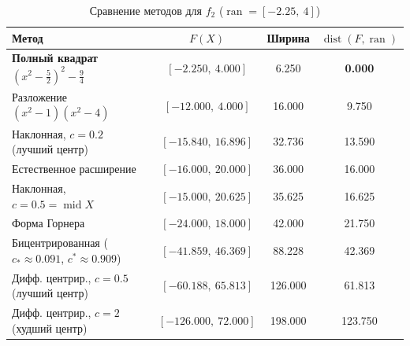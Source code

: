 \documentclass[12pt,a4paper]{article}
\newcommand{\ran}{\operatorname{ran}}
\newcommand{\Mid}{\operatorname{mid}}
\newcommand{\dist}{\operatorname{dist}}
\begin{document}
\begin{table}[H]
\centering
\begin{tabular}{|l|c|c|c|}
\hline
Метод & $F(X)$ & Ширина & $\dist(F,\ran)$ \\
\hline
\textbf{Полный квадрат} $(x^2-\frac52)^2-\frac94$ & $[-2.250,\ 4.000]$ & 6.250 & \textbf{0.000} \\
Разложение $(x^2-1)(x^2-4)$ & $[-12.000,\ 4.000]$ & 16.000 & 9.750 \\
Наклонная, $c=0.2$ (лучший центр) & $[-15.840,\ 16.896]$ & 32.736 & 13.590 \\
Естественное расширение & $[-16.000,\ 20.000]$ & 36.000 & 16.000 \\
Наклонная, $c=0.5=\Mid X$ & $[-15.000,\ 20.625]$ & 35.625 & 16.625 \\
Форма Горнера & $[-24.000,\ 18.000]$ & 42.000 & 21.750 \\
Бицентрированная ($c_{*}\approx0.091$, $c^{*}\approx0.909$) & $[-41.859,\ 46.369]$ & 88.228 & 42.369 \\
Дифф. центрир., $c=0.5$ (лучший центр) & $[-60.188,\ 65.813]$ & 126.000 & 61.813 \\
Дифф. центрир., $c=2$ (худший центр) & $[-126.000,\ 72.000]$ & 198.000 & 123.750 \\
\hline
\end{tabular}
\caption{Сравнение методов для $f_2$ ($\ran=[-2.25,\ 4]$)}
\label{tab:f2}
\end{table}
\end{document}
